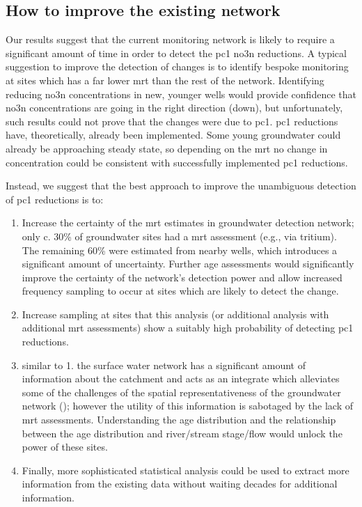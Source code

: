 \subsection[network improvements]{How to improve the existing network}

Our results suggest that the current monitoring network is likely to require a significant amount of time in order to detect the \gls{pc1} \gls{no3n} reductions. A typical suggestion to improve the detection of changes is to identify bespoke monitoring at sites which has a far lower \gls{mrt} than the rest of the network. Identifying reducing \gls{no3n} concentrations in new, younger wells would provide confidence that \gls{no3n} concentrations are going in the right direction (down), but unfortunately, such results could not prove that the changes were due to \gls{pc1}. \gls{pc1} reductions have, theoretically, already been implemented. Some young groundwater could already be approaching steady state, so depending on the \gls{mrt} no change in concentration could be consistent with successfully implemented \gls{pc1} reductions.

Instead, we suggest that the best approach to improve the unambiguous detection of \gls{pc1} reductions is to:
\begin{enumerate}
    \item Increase the certainty of the \gls{mrt} estimates in groundwater detection network; only c. 30\% of groundwater sites had a \gls{mrt} assessment (e.g., via tritium).  The remaining 60\% were estimated from nearby wells, which introduces a significant amount of uncertainty. Further age assessments would significantly improve the certainty of the network's detection power and allow increased frequency sampling to occur at sites which are likely to detect the change.
    \item Increase sampling at sites that this analysis (or additional analysis with additional \gls{mrt} assessments) show a suitably high probability of detecting \gls{pc1} reductions. %
    \item similar to 1. the surface water network has a significant amount of information about the catchment and acts as an integrate which alleviates some of the challenges of the spatial representativeness of the groundwater network (); however the utility of this information is sabotaged by the lack of \gls{mrt} assessments. Understanding the age distribution and the relationship between the age distribution and river/stream stage/flow would unlock the power of these sites.
    \item Finally, more sophisticated statistical analysis could be used to extract more information from the existing data without waiting decades for additional information.
\end{enumerate}